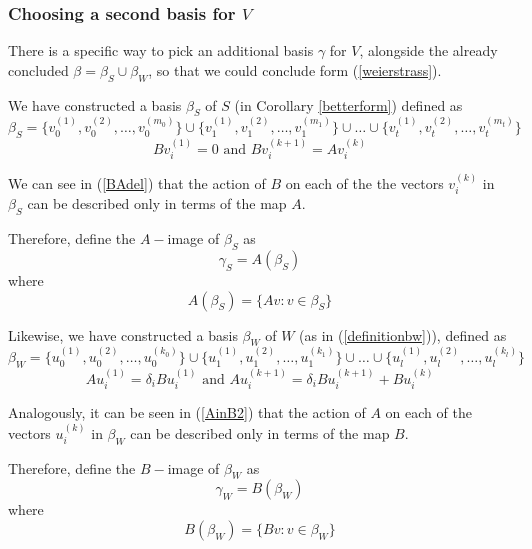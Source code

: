 \subsubsection{Choosing a second basis for $V$}
There is a specific way to pick an additional basis $\gamma$ for $V$, alongside the already concluded $\beta=\beta_S\cup \beta_W$, so that we could conclude form (\ref{weierstrass}).

We have constructed a basis $\beta_S$ of $S$ (in Corollary \ref{betterform}) defined as \begin{equation}
\beta_S=\{v_{0}^{(1)},v_{0}^{(2)},\dots,v_{0}^{(m_0)}\} \cup \{v_{1}^{(1)},v_{1}^{(2)},\dots,v_{1}^{(m_1)}\} \cup \dots \cup \{v_{t}^{(1)},v_{t}^{(2)},\dots,v_{t}^{(m_t)}\} \label{eq:vbasis}
 \end{equation}
\begin{equation}\label{BAdel}
   Bv_{i}^{(1)}=0 \text{ and } Bv_{i}^{(k+1)}=Av_{i}^{(k)}
\end{equation}


We can see in (\ref{BAdel}) that the action of $B$ on each of the the vectors $v_i^{(k)}$ in $\beta_S$ can be described only in terms of the map $A$.



Therefore, define the $A-$image of $\beta_S$ as $$\boxed{\gamma_S=A(\beta_S)}$$ where
\begin{equation}
    A(\beta_S)=\{Av:v\in \beta_S\}
\end{equation}

Likewise, we have constructed a basis $\beta_W$ of $W$ (as in (\ref{definitionbw})), defined as
  \begin{equation}
\beta_W=\{u_{0}^{(1)},u_{0}^{(2)},\dots,u_{0}^{(k_0)}\} \cup \{u_{1}^{(1)},u_{1}^{(2)},\dots,u_{1}^{(k_1)}\} \cup \dots \cup \{u_{l}^{(1)},u_{l}^{(2)},\dots,u_{l}^{(k_l)}\}  \label{eq:vbasis22}
 \end{equation}
  \begin{equation}\label{AinB2}
        Au_{i}^{(1)}=\delta_i Bu_{i}^{(1)}\text{ and }Au_{i}^{(k+1)}=\delta_i Bu_{i}^{(k+1)}+Bu_{i}^{(k)}
    \end{equation}

Analogously, it can be seen in (\ref{AinB2}) that the action of $A$ on each of the vectors $u_i^{(k)}$ in $\beta_W$ can be described only in terms of the map $B$.

Therefore, define the $B-$image of $\beta_W$ as $$\boxed{\gamma_W=B(\beta_W)}$$ where
\begin{equation}
    B(\beta_W)=\{Bv:v\in \beta_W\}
\end{equation}

